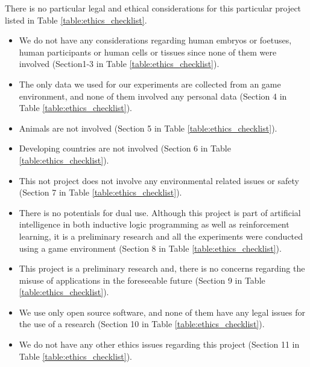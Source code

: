 There is no particular legal and ethical considerations for this particular project listed in Table \ref{table:ethics_checklist}.
\begin{itemize}
    \item We do not have any considerations regarding human embryos or foetuses, human participants or human cells or tissues since none of them were involved (Section1-3 in Table \ref{table:ethics_checklist}). \item The only data we used for our experiments are collected from an game environment, and none of them involved any personal data (Section 4 in Table \ref{table:ethics_checklist}). 
    \item Animals are not involved (Section 5 in Table \ref{table:ethics_checklist}).
    \item Developing countries are not involved (Section 6 in Table \ref{table:ethics_checklist}).
    \item This not project does not involve any environmental related issues or safety (Section 7 in Table \ref{table:ethics_checklist}).
    \item There is no potentials for dual use. Although this project is part of artificial intelligence in both inductive logic programming as well as reinforcement learning, it is a preliminary research and all the experiments were conducted using a game environment (Section 8 in Table \ref{table:ethics_checklist}).
    \item This project is a preliminary research and, there is no concerns regarding the misuse of applications in the foreseeable future (Section 9 in Table \ref{table:ethics_checklist}).
    \item We use only open source software, and none of them have any legal issues for the use of a research (Section 10 in Table \ref{table:ethics_checklist}).
    \item We do not have any other ethics issues regarding this project (Section 11 in Table \ref{table:ethics_checklist}).
\end{itemize}



